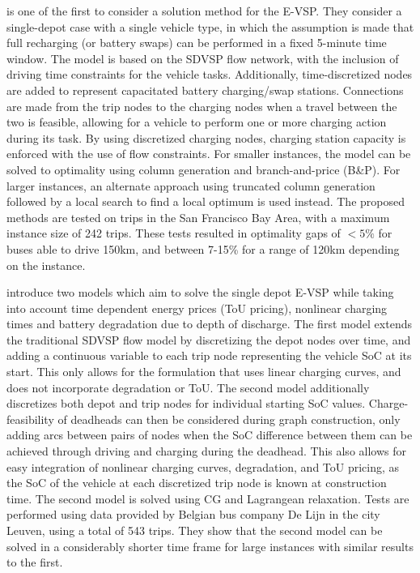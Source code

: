 \documentclass[]{article}
\begin{document}
\citet{Li2014} is one of the first to consider a solution method for the E-VSP. They consider a single-depot case with a single vehicle type, in which the assumption is made that full recharging (or battery swaps) can be performed in a fixed 5-minute time window. The model is based on the SDVSP flow network, with the inclusion of driving time constraints for the vehicle tasks. Additionally, time-discretized nodes are added to represent capacitated battery charging/swap stations. Connections are made from the trip nodes to the charging nodes when a travel between the two is feasible, allowing for a vehicle to perform one or more charging action during its task. By using discretized charging nodes, charging station capacity is enforced with the use of flow constraints. For smaller instances, the model can be solved to optimality using column generation and branch-and-price (B\&P). For larger instances, an alternate approach using truncated column generation followed by a local search to find a local optimum is used instead. The proposed methods are tested on trips in the San Francisco Bay Area, with a maximum instance size of 242 trips. These tests resulted in optimality gaps of $<5\%$ for buses able to drive 150km, and between 7-15\%  for a range of 120km depending on the instance.

 introduce two models which aim to solve the single depot E-VSP while taking into account time dependent energy prices (ToU pricing), nonlinear charging times and battery degradation due to depth of discharge. The first model extends the traditional SDVSP flow model by discretizing the depot nodes over time, and adding a continuous variable to each trip node representing the vehicle SoC at its start. This only allows for the formulation that uses linear charging curves, and does not incorporate degradation or ToU. The second model additionally discretizes both depot and trip nodes for individual starting SoC values. Charge-feasibility of deadheads can then be considered during graph construction, only adding arcs between pairs of nodes when the SoC difference between them can be achieved through driving and charging during the deadhead. This also allows for easy integration of nonlinear charging curves, degradation, and ToU pricing, as the SoC of the vehicle at each discretized trip node is known at construction time. The second model is solved using CG and Lagrangean relaxation. Tests are performed using data provided by Belgian bus company De Lijn in the city Leuven, using a total of 543 trips. They show that the second model can be solved in a considerably shorter time frame for large instances with similar results to the first.
\end{document}
